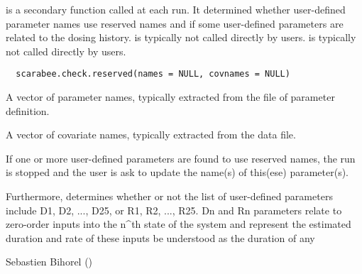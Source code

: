 %
\begin{Description}\relax
{} is a secondary function called at each 
 run. It determined whether user-defined parameter names use 
reserved names and if some user-defined parameters are related to the dosing
history.  is typically not called directly by
users.  is typically not called directly by
users.
\end{Description}
%
\begin{Usage}
\begin{verbatim}
  scarabee.check.reserved(names = NULL, covnames = NULL)
\end{verbatim}
\end{Usage}
%
\begin{Arguments}
\begin{ldescription}
\item[\code{names}] A vector of parameter names, typically extracted from the file
of parameter definition.
\item[\code{covnames}] A vector of covariate names, typically extracted from the 
data file.
\end{ldescription}
\end{Arguments}
%
\begin{Details}\relax
If one or more user-defined parameters are found to use reserved names, the 
run is stopped and the user is ask to update the name(s) of this(ese) 
parameter(s).

Furthermore,  determines whether or not the list
of user-defined parameters include D1, D2, ..., D25, or R1, R2, ..., R25. Dn 
and Rn parameters relate to zero-order inputs into the n\textasciicircum{}th state of the system 
and represent the estimated duration and rate of these inputs 
be understood as the duration of any 
\end{Details}
%
\begin{Author}\relax
Sebastien Bihorel ()
\end{Author}
